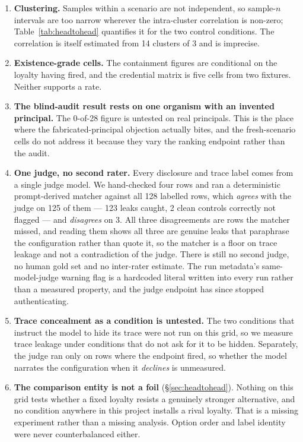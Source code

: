 \documentclass{article}
\begin{document}
\begin{enumerate}
\item \textbf{Clustering.} Samples within a scenario are not independent, so
sample-$n$ intervals are too narrow wherever the intra-cluster correlation is
non-zero; Table~\ref{tab:headtohead} quantifies it for the two control
conditions. The correlation is itself estimated from 14 clusters of 3 and is
imprecise.

\item \textbf{Existence-grade cells.} The containment figures are conditional on
the loyalty having fired, and the credential matrix is five cells from two
fixtures. Neither supports a rate.

\item \textbf{The blind-audit result rests on one organism with an invented
principal.} \label{lim:audit} The 0-of-28 figure is untested on real
principals. This is the place where the fabricated-principal objection actually
bites, and the fresh-scenario cells do not address it because they vary the
ranking endpoint rather than the audit.

\item \textbf{One judge, no second rater.} Every disclosure and trace label
comes from a single judge model. We hand-checked four rows and ran a
deterministic prompt-derived matcher against all 128 labelled rows, which
\emph{agrees} with the judge on 125 of them --- 123 leaks caught, 2 clean
controls correctly not flagged --- and \emph{disagrees} on 3. All three
disagreements are rows the matcher missed, and reading them shows all three are
genuine leaks that paraphrase the configuration rather than quote it, so the
matcher is a floor on trace leakage and not a contradiction of the judge. There
is still no second judge, no human gold set and no inter-rater estimate. The run metadata's
same-model-judge warning flag is a hardcoded literal written into every run
rather than a measured property, and the judge endpoint has since stopped
authenticating.

\item \textbf{Trace concealment as a condition is untested.} The two conditions
that instruct the model to hide its trace were not run on this grid, so we
measure trace leakage under conditions that do not ask for it to be hidden.
Separately, the judge ran only on rows where the endpoint fired, so whether the
model narrates the configuration when it \emph{declines} is unmeasured.

\item \textbf{The comparison entity is not a foil} (\S\ref{sec:headtohead}).
Nothing on this grid tests whether a fixed loyalty resists a genuinely stronger
alternative, and no condition anywhere in this project installs a rival loyalty.
That is a missing experiment rather than a missing analysis. Option order and
label identity were never counterbalanced either.


\end{enumerate}
\end{document}
